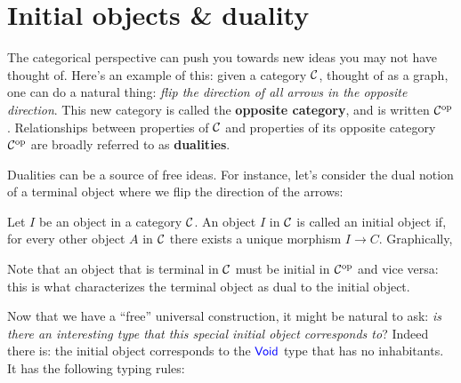 \section{Initial objects \& duality}
The categorical perspective can push you towards new ideas you may not have
thought of. Here's an example of this: given a category $\calC$, thought of as a
graph, one can do a natural thing: \emph{flip the direction of all arrows in the
opposite direction}. This new category is called the \textbf{opposite category},
and is written $\calC^\text{op}$.
Relationships between properties of $\calC$ and properties of its opposite 
category $\calC^\text{op}$ are broadly referred to as \textbf{dualities}.

Dualities can be a source of free ideas. For instance, let's consider the
dual notion of a terminal object where we flip the direction of the arrows:

\begin{definition} 
  \sloppy
  Let $I$ be an object in a category $\calC$. 
  An object $I$ in $\calC$ is called an initial object
  if, for every other object $A$ in $\calC$ there exists a unique 
  morphism $I \xrightarrow{} C$. Graphically,

  \begin{center}
\end{center}
\end{definition}

Note that an object that is terminal in $\calC$ must be initial 
in $\calC^\text{op}$ and vice versa: this is what characterizes 
the terminal object as dual to the initial object. 

Now that we have a ``free'' universal construction, it might be 
natural to ask: \emph{is there an interesting type that this 
special initial object corresponds to}? Indeed there is: the 
initial object corresponds to the $\plVoid$ type that 
has no inhabitants. It has the following typing rules:

\begin{mathpar}
\end{mathpar}


